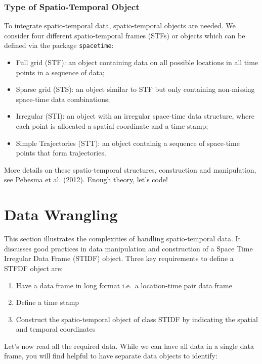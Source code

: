 \documentclass[
  letterpaper,
  DIV=11,
  numbers=noendperiod,
  oneside]{scrreprt}
\begin{document}
\subsubsection{Type of Spatio-Temporal
Object}\label{type-of-spatio-temporal-object}

To integrate spatio-temporal data, spatio-temporal objects are needed.
We consider four different spatio-temporal frames (STFs) or objects
which can be defined via the package \texttt{spacetime}:

\begin{itemize}
\item
  Full grid (STF): an object containing data on all possible locations
  in all time points in a sequence of data;
\item
  Sparse grid (STS): an object similar to STF but only containing
  non-missing space-time data combinations;
\item
  Irregular (STI): an object with an irregular space-time data
  structure, where each point is allocated a spatial coordinate and a
  time stamp;
\item
  Simple Trajectories (STT): an object containig a sequence of
  space-time points that form trajectories.
\end{itemize}

More details on these spatio-temporal structures, construction and
manipulation, see Pebesma et al. (2012). Enough theory, let's code!

\section{Data Wrangling}\label{data-wrangling}

This section illustrates the complexities of handling spatio-temporal
data. It discusses good practices in data manipulation and construction
of a Space Time Irregular Data Frame (STIDF) object. Three key
requirements to define a STFDF object are:

\begin{enumerate}
\def\labelenumi{\arabic{enumi}.}
\item
  Have a data frame in long format i.e.~a location-time pair data frame
\item
  Define a time stamp
\item
  Construct the spatio-temporal object of class STIDF by indicating the
  spatial and temporal coordinates
\end{enumerate}

Let's now read all the required data. While we can have all data in a
single data frame, you will find helpful to have separate data objects
to identify:
\end{document}
